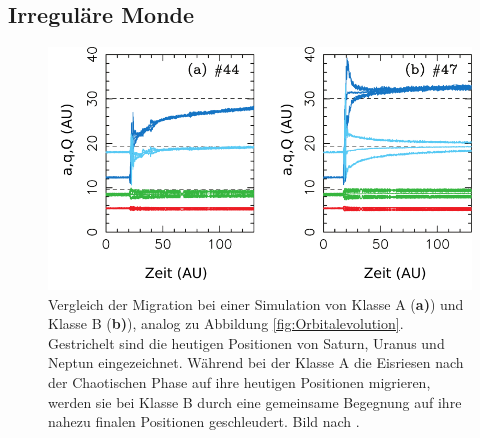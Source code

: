 \documentclass[12pt,a4paper,twoside,open=right,bibliography=totoc]{scrbook}
\renewcommand{\cite}{ \citep}
\begin{document}
\subsection{Irreguläre Monde}

\begin{figure}[tbn]
\centering
\includegraphics[scale=0.9]{img/Nesvorny2007-1}
\caption{Vergleich der Migration bei einer Simulation von Klasse A (\textbf{a)}) und Klasse B (\textbf{b)}), analog zu Abbildung \ref{fig:Orbitalevolution}. Gestrichelt sind die heutigen Positionen von Saturn, Uranus und Neptun eingezeichnet. Während bei der Klasse A die Eisriesen nach der Chaotischen Phase auf ihre heutigen Positionen migrieren, werden sie bei Klasse B durch eine gemeinsame Begegnung auf ihre nahezu finalen Positionen geschleudert. Bild nach \cite{Nesvorny2007}.}
\label{fig:Orbitalevolution_vergleich}
\end{figure}
\end{document}
